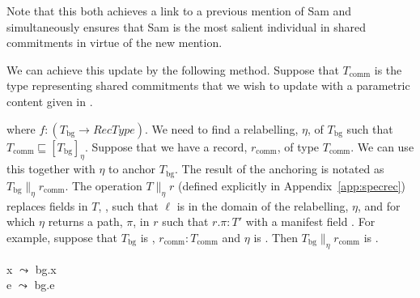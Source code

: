 Note that this both achieves a link to a previous mention of Sam and
simultaneously ensures that Sam is the most salient individual in
shared commitments in virtue of the new mention.


We can achieve this update by the following method.  Suppose that $T_{\mathrm{comm}}$ is the
type representing shared commitments that we wish to update with a
parametric content given in \nexteg{}.
\begin{ex}
\end{ex}
where $f:(T_{\mathrm{bg}}\rightarrow\textit{RecType})$.  %
We
need to find a relabelling, $\eta$, of 
$T_{\mathrm{bg}}$ such that $T_{\mathrm{comm}}\sqsubseteq[T_{\mathrm{bg}}]_\eta$.
Suppose that we have a record, $r_{\mathrm{comm}}$, of type
$T_{\mathrm{comm}}$.  We can use this together with $\eta$ to anchor
$T_{\mathrm{bg}}$.  The result of the anchoring is notated as 
$T_{\mathrm{bg}}\parallel_\eta r_{\mathrm{comm}}$. The operation
$T \parallel_\eta r$ (defined explicitly in
Appendix~\ref{app:specrec}) replaces fields in $T$, , such
that $\ell$ is in the
domain of the relabelling, $\eta$, and for which $\eta$ returns a
path, $\pi$,
in $r$ such that $r.\pi:T'$ with a manifest
field . For example,
suppose that $T_{\mathrm{bg}}$ is ,
$r_{\mathrm{comm}}:T_{\mathrm{comm}}$ and $\eta$ is . Then
\mbox{$T_{\mathrm{bg}}\parallel_\eta r_{\mathrm{comm}}$} is .
\begin{ex} 
\begin{subex} 
 
\item {} 
 
\item x $\leadsto$ bg.x\\
      e $\leadsto$ bg.e

\item {}
 
\end{subex} 
   
\end{ex} 
  

